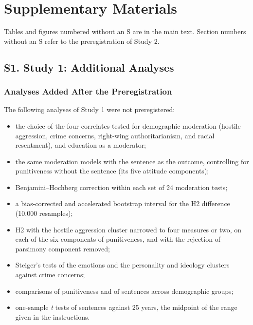 
\section{Supplementary Materials}\label{supplementary-materials}

Tables and figures numbered without an S are in the main text. Section numbers without an S refer to the preregistration of Study 2.

\subsection{S1. Study 1: Additional Analyses}\label{s1.-study-1-additional-analyses}

\subsubsection{Analyses Added After the Preregistration}\label{analyses-added-after-the-preregistration}

The following analyses of Study 1 were not preregistered:

\begin{itemize}
\tightlist
\item
  the choice of the four correlates tested for demographic moderation (hostile aggression, crime concerns, right-wing authoritarianism, and racial resentment), and education as a moderator;
\item
  the same moderation models with the sentence as the outcome, controlling for punitiveness without the sentence (its five attitude components);
\item
  Benjamini--Hochberg correction within each set of 24 moderation tests;
\item
  a bias-corrected and accelerated bootstrap interval for the H2 difference (10,000 resamples);
\item
  H2 with the hostile aggression cluster narrowed to four measures or two, on each of the six components of punitiveness, and with the rejection-of-parsimony component removed;
\item
  Steiger's tests of the emotions and the personality and ideology clusters against crime concerns;
\item
  comparisons of punitiveness and of sentences across demographic groups;
\item
  one-sample \emph{t} tests of sentences against 25 years, the midpoint of the range given in the instructions.
\end{itemize}

